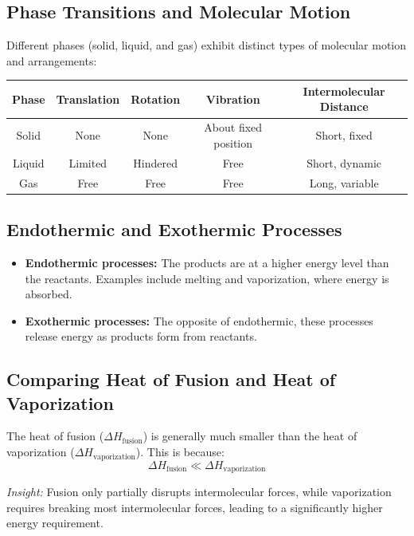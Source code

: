 \documentclass{report}
\begin{document}
\subsection{Phase Transitions and Molecular Motion}
Different phases (solid, liquid, and gas) exhibit distinct types of molecular motion and arrangements:
\begin{center}
    \begin{tabular}{|c|c|c|c|c|}
        \hline
        \textbf{Phase} & \textbf{Translation} & \textbf{Rotation} & \textbf{Vibration} & \textbf{Intermolecular Distance} \\
        \hline
        Solid & None & None & About fixed position & Short, fixed \\
        \hline
        Liquid & Limited & Hindered & Free & Short, dynamic \\
        \hline
        Gas & Free & Free & Free & Long, variable \\
        \hline
    \end{tabular}
\end{center}

\subsection{Endothermic and Exothermic Processes}
\begin{itemize}
    \item \textbf{Endothermic processes:} The products are at a higher energy level than the reactants. Examples include melting and vaporization, where energy is absorbed.
    \item \textbf{Exothermic processes:} The opposite of endothermic, these processes release energy as products form from reactants.
\end{itemize}

\subsection{Comparing Heat of Fusion and Heat of Vaporization}
The heat of fusion (\( \Delta H_{\text{fusion}} \)) is generally much smaller than the heat of vaporization (\( \Delta H_{\text{vaporization}} \)). This is because:
\[
\Delta H_{\text{fusion}} \ll \Delta H_{\text{vaporization}}
\]
\begin{center}
    \textit{Insight:} Fusion only partially disrupts intermolecular forces, while vaporization requires breaking most intermolecular forces, leading to a significantly higher energy requirement.
\end{center}
\end{document}
